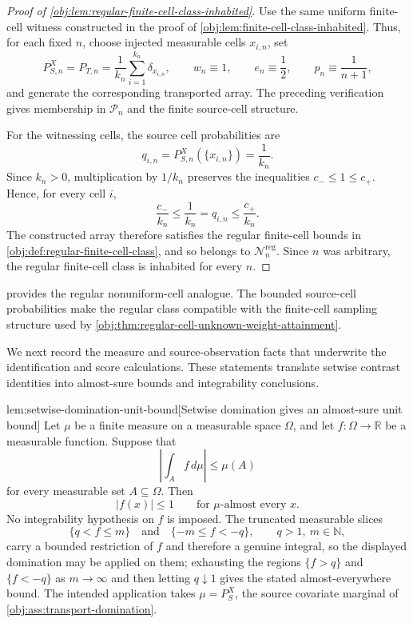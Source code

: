 \documentclass[11pt]{article}
\begin{document}
\begin{proof}[Proof of \cref{obj:lem:regular-finite-cell-class-inhabited}]
Use the same uniform finite-cell witness constructed in the proof of \cref{obj:lem:finite-cell-class-inhabited}. Thus, for each fixed \(n\), choose injected measurable cells \(x_{i,n}\), set
\[
P_{S,n}^X=P_{T,n}
=
\frac1{k_n}\sum_{i=1}^{k_n}\delta_{x_{i,n}},
\qquad
w_n\equiv1,\qquad
e_n\equiv\frac12,\qquad
p_n\equiv\frac1{n+1},
\]
and generate the corresponding transported array. The preceding verification gives membership in \(\mathcal P_n\) and the finite source-cell structure. %

For the witnessing cells, the source cell probabilities are
\[
q_{i,n}=P_{S,n}^X(\{x_{i,n}\})=\frac1{k_n}.
\]
Since \(k_n>0\), multiplication by \(1/k_n\) preserves the inequalities \(c_-\le1\le c_+\). Hence, for every cell \(i\),
\[
\frac{c_-}{k_n}\le\frac1{k_n}=q_{i,n}\le\frac{c_+}{k_n}.
\]
The constructed array therefore satisfies the regular finite-cell bounds in \cref{obj:def:regular-finite-cell-class}, and so belongs to \(\mathcal N_n^{\mathrm{reg}}\). Since \(n\) was arbitrary, the regular finite-cell class is inhabited for every \(n\). %
\end{proof}

 provides the regular nonuniform-cell analogue. The bounded source-cell probabilities make the regular class compatible with the finite-cell sampling structure used by \cref{obj:thm:regular-cell-unknown-weight-attainment}.

We next record the measure and source-observation facts that underwrite the identification and score calculations. These statements translate setwise contrast identities into almost-sure bounds and integrability conclusions.

\begin{lemmav}{lem:setwise-domination-unit-bound}[Setwise domination gives an almost-sure unit bound]
Let \(\mu\) be a finite measure on a measurable space \(\Omega\), and let \(f:\Omega\to\mathbb R\) be a measurable function. Suppose that
\[
\left|\int_A f\,d\mu\right|\le\mu(A)
\]
for every measurable set \(A\subseteq\Omega\). Then
\[
|f(x)|\le 1\qquad\text{for }\mu\text{-almost every }x .
\]
No integrability hypothesis on \(f\) is imposed. The truncated measurable slices
\[
\{q<f\le m\}\quad\text{and}\quad\{-m\le f<-q\},\qquad q>1,\ m\in\mathbb N,
\]
carry a bounded restriction of \(f\) and therefore a genuine integral, so the displayed domination may be applied on them; exhausting the regions \(\{f>q\}\) and \(\{f<-q\}\) as \(m\to\infty\) and then letting \(q\downarrow 1\) gives the stated almost-everywhere bound. The intended application takes \(\mu=P_S^X\), the source covariate marginal of \cref{obj:ass:transport-domination}.
\end{lemmav}
\end{document}
